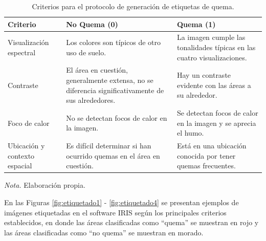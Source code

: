 \begin{table}[H]
    \centering
    \caption{Criterios para el protocolo de generación de etiquetas de quema.}
    \label{tab:criterios_quema}
    \begin{tabularx}{\textwidth}{XXX}
        \hline
        \textbf{Criterio} & \textbf{No Quema (0)} & \textbf{Quema (1)} \\
        \hline
        Visualización espectral & Los colores son típicos de otro uso de suelo. & La imagen cumple las tonalidades típicas en las cuatro visualizaciones. \\
        Contraste & El área en cuestión, generalmente extensa, no se diferencia significativamente de sus alrededores. & Hay un contraste evidente con las áreas a su alrededor. \\
        Foco de calor & No se detectan focos de calor en la imagen. & Se detectan focos de calor en la imagen y se aprecia el humo. \\
        Ubicación y contexto espacial & Es difícil determinar si han ocurrido quemas en el área en cuestión. & Está en una ubicación conocida por tener quemas frecuentes. \\
        \hline
    \end{tabularx}
    \begin{flushleft}
        \textit{Nota.} Elaboración propia.        
        \vspace{-\baselineskip}
    \end{flushleft}
\end{table}

En las Figuras \ref{fig:etiquetado1} - \ref{fig:etiquetado4} se presentan ejemplos de imágenes etiquetadas en el software IRIS según los principales criterios establecidos, en donde las áreas 
clasificadas como ``quema'' se muestran en rojo y las áreas clasificadas como ``no quema'' se muestran en morado.

